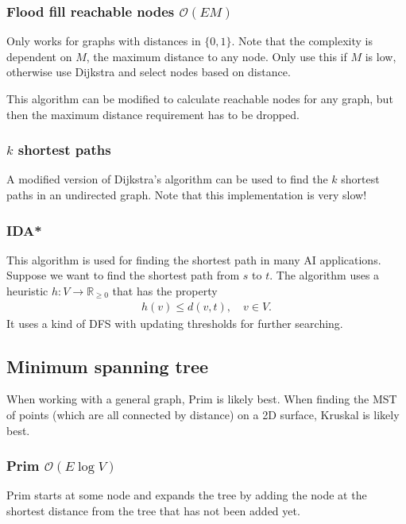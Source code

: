 \subsubsection{Flood fill reachable nodes $\mathcal O(EM)$}
Only works for graphs with distances in $\{0, 1\}$. Note that the complexity is dependent on $M$, the maximum distance to any node. Only use this if $M$ is low, otherwise use Dijkstra and select nodes based on distance.

This algorithm can be modified to calculate reachable nodes for any graph, but then the maximum distance requirement has to be dropped.

\subsubsection{$k$ shortest paths}
A modified version of Dijkstra's algorithm can be used to find the $k$ shortest paths in an undirected graph. Note that this implementation is very slow!

\subsubsection{IDA*}
This algorithm is used for finding the shortest path in many AI applications. Suppose we want to find the shortest path from $s$ to $t$. The algorithm uses a heuristic $h: V \to \mathbb R_{\geq 0}$ that has the property
\begin{align*}
    h(v) \leq d(v, t), \quad v \in V.
\end{align*}
It uses a kind of DFS with updating thresholds for further searching.



\subsection{Minimum spanning tree}

When working with a general graph, Prim is likely best. When finding the MST of points (which are all connected by distance) on a 2D surface, Kruskal is likely best.

\subsubsection{Prim $\mathcal O(E\log V)$}
Prim starts at some node and expands the tree by adding the node at the shortest distance from the tree that has not been added yet.

